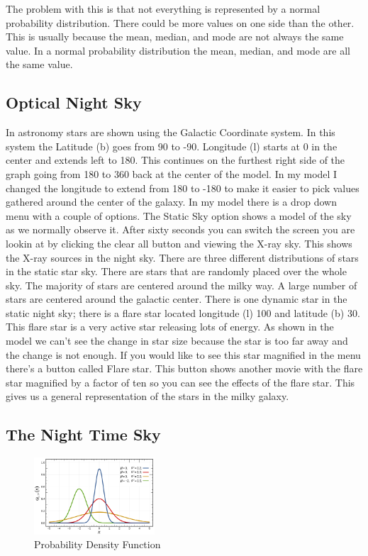 \documentclass[final,6p,times,twocolumn,authoryear]{elsarticle}
\begin{document}
The problem with this is that not everything is represented by a normal probability distribution. There could be more values on one side than the other. This is usually because the mean, median, and mode are not always the same value. In a normal probability distribution the mean, median, and mode are all the same value. 

\subsection{Optical Night Sky}
In astronomy stars are shown using the Galactic Coordinate system. In this system the Latitude (b) goes from 90 to -90. Longitude (l) starts at 0 in the center and extends left to 180. This continues on the furthest right side of the graph going from 180 to 360 back at the center of the model. In my model I changed the longitude to extend from 180 to -180 to make it easier to pick values gathered around the center of the galaxy. 
In my model there is a drop down menu with a couple of options. The Static Sky option shows a model of the sky as we normally observe it. After sixty seconds you can switch the screen you are lookin at by clicking the clear all button and viewing the X-ray sky. This shows the X-ray sources in the night sky. 
There are three different distributions of stars in the static star sky. There are stars that are randomly placed over the whole sky. The majority of stars are centered around the milky way. A large number of stars are centered around the galactic center. There is one dynamic star in the static night sky; there is a flare star located longitude (l) 100 and latitude (b) 30. This flare star is a very active star releasing lots of energy. As shown in the model we can’t see the change in star size because the star is too far away and the change is not enough. If you would like to see this star magnified in the menu there's a button called Flare star. This button shows another movie with the flare star magnified by a factor of ten so you can see the effects of the flare star. This gives us a general representation of the stars in the milky galaxy.

\subsection{The Night Time Sky}

\begin{figure}
	\centering 
	\includegraphics[width=0.4\textwidth, angle=-0]{1024px-norm.png}	
	\caption{Probability Density Function} 
	\label{fig_mom0}%
\end{figure}
\end{document}
